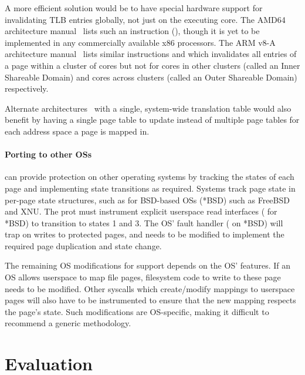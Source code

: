 \documentclass[letterpaper,twocolumn,10pt]{article}
\begin{document}
A more efficient solution would be to have special hardware support
for invalidating TLB entries globally, not just on the executing 
core. 
The AMD64 architecture manual~\cite{amd64prog} lists such an instruction 
(), though it is yet to be implemented in any commercially 
available x86 processors.
The ARM v8-A architecture manual~\cite{armv8a} lists similar instructions 
 and  which invalidates all entries 
of a page within a cluster of cores but not for cores in other clusters
(called an Inner Shareable Domain) and cores across clusters (called an 
Outer Shareable Domain) respectively.

Alternate architectures~\cite{guptarebooting,ChaseLFL94} with a single, 
system-wide translation table
would also benefit \tiktok by having a single page table to 
update instead of multiple page tables for each address space a page
is mapped in.

\paragraph{Porting to other OSs}

\tiktok can provide \tocttou protection on other operating systems by 
tracking the states of each page and implementing state transitions 
as required.
Systems track page state in per-page state structures,
such as  for BSD-based OSs (*BSD) such as FreeBSD and XNU.
The prot must instrument explicit userspace read interfaces 
( for *BSD) to transition to states 1 and 3.
The OS' fault handler ( on *BSD) will trap on writes to 
protected pages, and needs to be modified to implement the required page 
duplication and state change.

The remaining OS modifications for \tiktok support depends on 
the OS' features.
If an OS allows userspace to map file pages, filesystem code to write 
to these page needs to be modified.
Other syscalls which create/modify mappings to userspace pages will 
also have to be instrumented to ensure that the new mapping respects the
page's state. 
Such modifications are OS-specific, making it difficult to recommend
a generic methodology.



\section{Evaluation}
\end{document}
